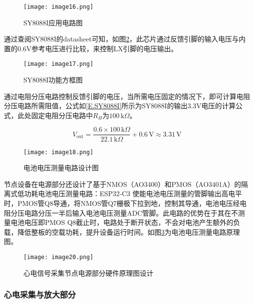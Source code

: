 \begin{figure}[hbt]
    \centering
    \texttt{[image: image16.png]}
    \caption{SY8088I应用电路图}
    \label{F.ECG_image16}
\end{figure}

通过查阅SY8088I的datasheet可知，如图\ref{F.ECG_image17}，此芯片通过反馈引脚的输入电压与内置的0.6V参考电压进行比较，来控制LX引脚的电压输出。

\begin{figure}[hbt]
    \centering
    \texttt{[image: image17.png]}
    \caption{SY8088I功能方框图\cite{SY8088}}
    \label{F.ECG_image17}
\end{figure}

通过电阻分压电路控制反馈引脚的电压，当所需电压固定的情况下，即可计算电阻分压电路所需阻值，公式如\ref{E.SY8088I}所示为SY8088I的输出3.3V电压的计算公式，此处固定电阻分压电路中$R_H$为$100\,\text{k}\Omega$。

\begin{equation}
        V_{\text{out}} = \frac{0.6 \times 100\,\text{k}\Omega}{22.1\,\text{k}\Omega} + 0.6\,\text{V} \approx 3.31\,\text{V}
    \label{E.SY8088I}
\end{equation}

\begin{figure}[hbt]
    \centering
    \texttt{[image: image18.png]}
    \caption{电池电压测量电路设计图}
    \label{F.ECG_image18}
\end{figure}

节点设备在电源部分还设计了基于NMOS（AO3400）和PMOS（AO3401A）的隔离式低功耗电池电压测量电路：ESP32-C3 使能电池电压测量的管脚输出高电平时，PMOS管Q8导通，将NMOS管Q7栅极下拉到地，控制其导通，电池电压经电阻分压电路分压一半后输入电池电压测量ADC管脚。此电路的优势在于其在不测量电池电压即PMOS Q8截止时，电路处于断开状态，不会对电池产生额外的负载，降低整板的空载功耗，提升设备运行时间。如图\ref{F.ECG_image18}为电池电压测量电路原理图。

\begin{sidewaysfigure}
    \centering
    \texttt{[image: image20.png]}
    \caption{心电信号采集节点电源部分硬件原理图设计}
    \label{F.ECG_image20}
\end{sidewaysfigure}

\newpage

\subsubsection{心电采集与放大部分}

